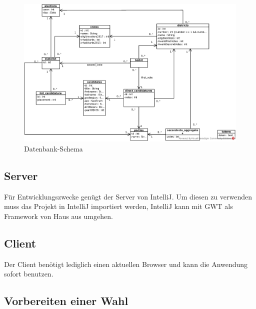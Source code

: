 \documentclass[a4paper]{scrreprt}
\begin{document}
\begin{figure}[H]
\centering
\includegraphics[width=\textwidth]{images/DBS_Schema.eps}
\caption {Datenbank-Schema}
\end{figure}

\subsection{Server}

Für Entwicklungszwecke genügt der Server von IntelliJ.
Um diesen zu verwenden muss das Projekt in IntelliJ importiert werden, IntelliJ kann mit GWT als Framework von Haus aus umgehen.

\subsection{Client}

Der Client benötigt lediglich einen aktuellen Browser und kann die Anwendung sofort benutzen.

\subsection{Vorbereiten einer Wahl}
\end{document}
